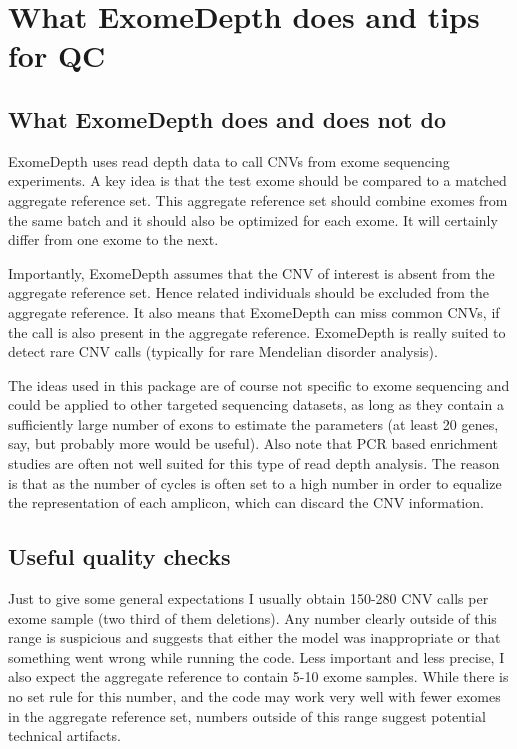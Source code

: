 \documentclass[10pt]{article}
\begin{document}
\section{What ExomeDepth does and tips for QC}

\subsection{What ExomeDepth does and does not do}

ExomeDepth uses read depth data to call CNVs from exome sequencing experiments.
A key idea is that the test exome should be compared to a matched aggregate reference set.
This aggregate reference set should combine exomes from the same batch and it should also be optimized for each exome.
It will certainly differ from one exome to the next.

Importantly, ExomeDepth assumes that the CNV of interest is absent from the aggregate reference set.
Hence related individuals should be excluded from the aggregate reference.
It also means that ExomeDepth can miss common CNVs, if the call is also present in the aggregate reference.
ExomeDepth is really suited to detect rare CNV calls (typically for rare Mendelian disorder analysis).

The ideas used in this package are of course not specific to exome sequencing and could be applied to other targeted sequencing datasets, as long as they contain a sufficiently large number of exons to estimate the parameters (at least 20 genes, say, but probably more would be useful).
Also note that PCR based enrichment studies are often not well suited for this type of read depth analysis.
The reason is that as the number of cycles is often set to a high number in order to equalize the representation of each amplicon, which can discard the CNV information.


\subsection{Useful quality checks}
Just to give some general expectations I usually obtain 150-280 CNV calls per exome sample (two third of them deletions).
Any number clearly outside of this range is suspicious and suggests that either the model was inappropriate or that something went wrong while running the code.
Less important and less precise, I also expect the aggregate reference to contain 5-10 exome samples. 
While there is no set rule for this number, and the code may work very well with fewer exomes in the aggregate reference set, numbers outside of this range suggest potential technical artifacts.
\end{document}
